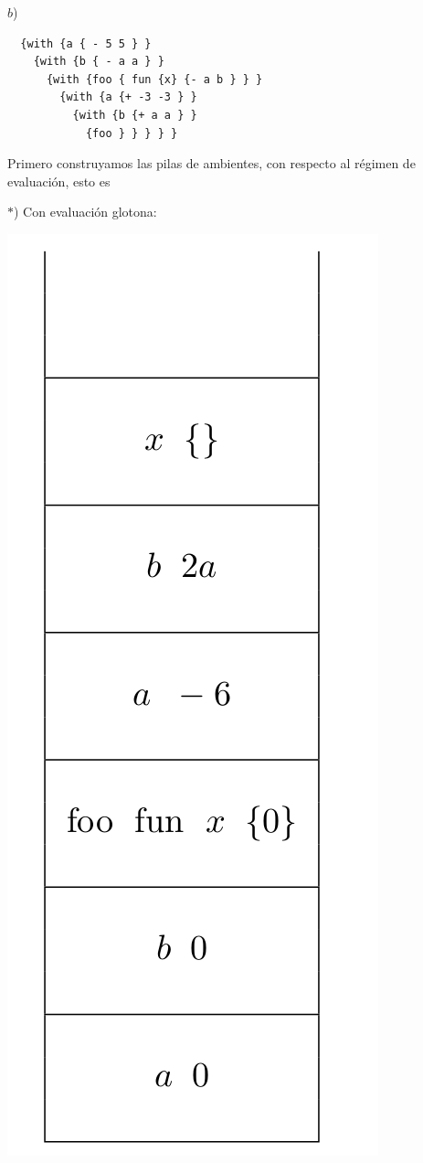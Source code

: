 \newpage
$b$) \begin{lstlisting}
  {with {a { - 5 5 } }
    {with {b { - a a } }
      {with {foo { fun {x} {- a b } } }
        {with {a {+ -3 -3 } }
          {with {b {+ a a } }
            {foo } } } } }
\end{lstlisting}

Primero construyamos las pilas de ambientes, con
respecto al régimen de evaluación, esto es 

$*$) Con evaluación glotona:
  \begin{center}
    \includegraphics[scale=0.3]{./GlotonaB}
  \end{center}

